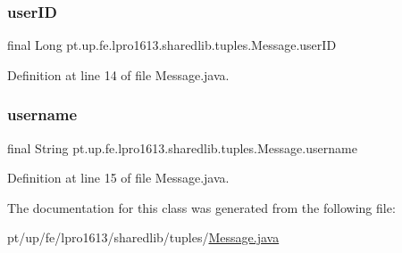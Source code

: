 \subsubsection{\texorpdfstring{user\+ID}{userID}}
{\footnotesize\ttfamily final Long pt.\+up.\+fe.\+lpro1613.\+sharedlib.\+tuples.\+Message.\+user\+ID}



Definition at line 14 of file Message.\+java.

\hypertarget{classpt_1_1up_1_1fe_1_1lpro1613_1_1sharedlib_1_1tuples_1_1_message_a061e241d4c8a800c6b5d7271d68c0c11}{}\label{classpt_1_1up_1_1fe_1_1lpro1613_1_1sharedlib_1_1tuples_1_1_message_a061e241d4c8a800c6b5d7271d68c0c11} 
\subsubsection{\texorpdfstring{username}{username}}
{\footnotesize\ttfamily final String pt.\+up.\+fe.\+lpro1613.\+sharedlib.\+tuples.\+Message.\+username}



Definition at line 15 of file Message.\+java.



The documentation for this class was generated from the following file\+:\begin{DoxyCompactItemize}
\item 
pt/up/fe/lpro1613/sharedlib/tuples/\hyperlink{_message_8java}{Message.\+java}\end{DoxyCompactItemize}
